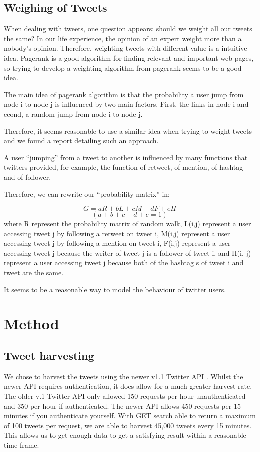 \documentclass[a4paper]{article}
\begin{document}
\subsection{Weighing of Tweets}
When dealing with tweets, one question appears: should we weight all our tweets the same? In our life experience, the opinion of an expert weight more than a nobody’s opinion. Therefore, weighting tweets with different value is a intuitive idea. Pagerank is a good algorithm for finding relevant and important web pages, so trying to develop a weighting algorithm from pagerank seems to be a good idea.

The main idea of pagerank algorithm is that the probability a user jump from node i to node j is influenced by two main factors. First, the links in node i and econd, a random jump from node i to node j.

Therefore, it seems reasonable to use a similar idea when trying to weight tweets and we found a report \cite{weigh2} detailing such an approach.

A user “jumping” from a tweet to another is influenced by many functions that twitters provided, for example, the function of retweet, of mention, of hashtag and of follower.

Therefore, we can rewrite our “probability matrix” in;

\[G = aR + bL + cM + dF + eH\]
\[(a + b + c + d + e = 1)\]
where R represent the probability matrix of random walk, L(i,j) represent a user accessing tweet j by following a retweet on tweet i, M(i,j) represent a user accessing tweet j by following a mention on tweet i, F(i,j) represent a user accessing  tweet j because the writer of tweet j is a follower of tweet i, and H(i, j) represent a user accessing tweet j because both of the hashtag s of tweet i and tweet are the same.

It seems to be a reasonable way to model the behaviour of twitter users.

\section{Method}
\subsection{Tweet harvesting}
We chose to harvest the tweets using the newer v1.1 Twitter API \cite{tw_api}. Whilst the newer API requires authentication, it does allow for a much greater harvest rate. The older v.1 Twitter API \cite{tw_api_1_0} only allowed 150 requests per hour unauthenticated and 350 per hour if authenticated. The newer API allows 450 requests per 15 minutes if you authenticate yourself. With GET search able to return a maximum of 100 tweets per request, we are able to harvest 45,000 tweets every 15 minutes. This allows us to get enough data to get a satisfying result within a reasonable time frame.
\end{document}
